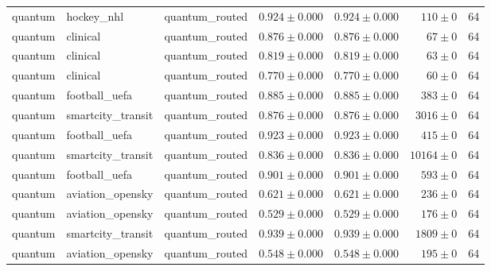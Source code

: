 \begin{table}[htbp]
\begin{tabular}{l l l r r r r}
quantum & hockey\_nhl & quantum\_routed & $0.924\pm0.000$ & $0.924\pm0.000$ & $110\pm0$ & 64 \\
quantum & clinical & quantum\_routed & $0.876\pm0.000$ & $0.876\pm0.000$ & $67\pm0$ & 64 \\
quantum & clinical & quantum\_routed & $0.819\pm0.000$ & $0.819\pm0.000$ & $63\pm0$ & 64 \\
quantum & clinical & quantum\_routed & $0.770\pm0.000$ & $0.770\pm0.000$ & $60\pm0$ & 64 \\
quantum & football\_uefa & quantum\_routed & $0.885\pm0.000$ & $0.885\pm0.000$ & $383\pm0$ & 64 \\
quantum & smartcity\_transit & quantum\_routed & $0.876\pm0.000$ & $0.876\pm0.000$ & $3016\pm0$ & 64 \\
quantum & football\_uefa & quantum\_routed & $0.923\pm0.000$ & $0.923\pm0.000$ & $415\pm0$ & 64 \\
quantum & smartcity\_transit & quantum\_routed & $0.836\pm0.000$ & $0.836\pm0.000$ & $10164\pm0$ & 64 \\
quantum & football\_uefa & quantum\_routed & $0.901\pm0.000$ & $0.901\pm0.000$ & $593\pm0$ & 64 \\
quantum & aviation\_opensky & quantum\_routed & $0.621\pm0.000$ & $0.621\pm0.000$ & $236\pm0$ & 64 \\
quantum & aviation\_opensky & quantum\_routed & $0.529\pm0.000$ & $0.529\pm0.000$ & $176\pm0$ & 64 \\
quantum & smartcity\_transit & quantum\_routed & $0.939\pm0.000$ & $0.939\pm0.000$ & $1809\pm0$ & 64 \\
quantum & aviation\_opensky & quantum\_routed & $0.548\pm0.000$ & $0.548\pm0.000$ & $195\pm0$ & 64 \\
\hline
\end{tabular}
\end{table}
